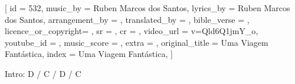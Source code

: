 [
    id                  = {532},
    music_by            = {Ruben Marcos dos Santos}, %
    lyrics_by           = {Ruben Marcos dos Santos}, %
    arrangement_by      = {}, %
    translated_by       = {}, %
    bible_verse         = {},
    licence_or_copyright= {},
    sr                  = {},
    cr                  = {},
    video_url           = {v=Qld6Q1jmY_o}, %
    youtube_id          = {}, %
    music_score         = {}, %
    extra               = {},
    original_title      = {Uma Viagem Fantástica}, %
    index               = {Uma Viagem Fantástica},
]

\beginverse
Intro:
D / C / D / C
\endverse

\beginverse

